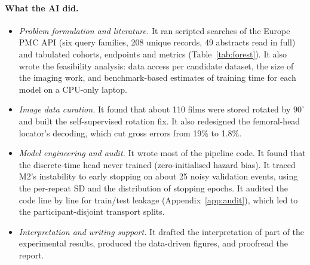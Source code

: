 \paragraph{What the AI did.}
\begin{itemize}[leftmargin=*,itemsep=1pt]
  \item \emph{Problem formulation and literature.} It ran scripted searches of the Europe PMC API (six query families, 208
        unique records, 49 abstracts read in full) and tabulated cohorts, endpoints and metrics (Table~\ref{tab:forest}).
        It also wrote the feasibility analysis: data access per candidate dataset, the size of the imaging work, and
        benchmark-based estimates of training time for each model on a CPU-only laptop.
  \item \emph{Image data curation.} It found that about 110 films were stored rotated by $90^\circ$ and built the
        self-supervised rotation fix. It also redesigned the femoral-head locator's decoding, which cut gross errors from
        19\% to 1.8\%.
  \item \emph{Model engineering and audit.} It wrote most of the pipeline code. It found that the discrete-time head
        never trained (zero-initialised hazard bias). It traced M2's instability to early stopping on about 25 noisy
        validation events, using the per-repeat SD and the distribution of stopping epochs. It audited the code line by
        line for train/test leakage (Appendix~\ref{app:audit}), which led to the participant-disjoint transport splits.
  \item \emph{Interpretation and writing support.} It drafted the interpretation of part of the experimental results,
        produced the data-driven figures, and proofread the report.
\end{itemize}


